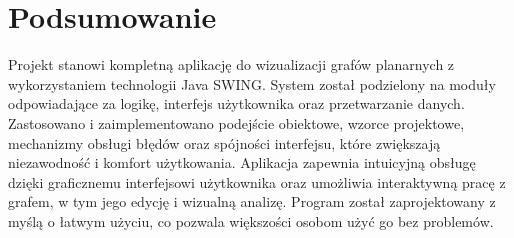 \documentclass[11pt,a4paper]{article}
\begin{document}
\section{Podsumowanie}

Projekt stanowi kompletną aplikację do wizualizacji grafów planarnych z wykorzystaniem technologii Java SWING. System został podzielony na moduły odpowiadające za logikę, interfejs użytkownika oraz przetwarzanie danych. Zastosowano i zaimplementowano podejście obiektowe, wzorce projektowe, mechanizmy obsługi błędów oraz spójności interfejsu, które zwiększają niezawodność i komfort użytkowania. Aplikacja zapewnia intuicyjną obsługę dzięki graficznemu interfejsowi użytkownika oraz umożliwia interaktywną pracę z grafem, w tym jego edycję i wizualną analizę. Program został zaprojektowany z myślą o łatwym użyciu, co pozwala większości osobom użyć go bez problemów.
\end{document}
